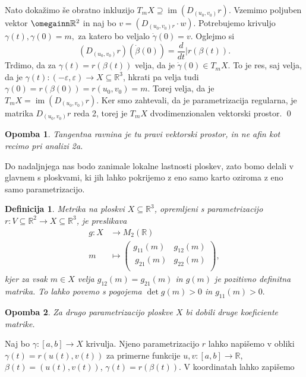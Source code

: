 \documentclass[10pt, a4paper]{article}
\newtheorem{defi}[izr]{Definicija}
\newenvironment{noticeB}{%
  \tcolorbox[%
  notitle,
  empty,
  enhanced,  %
  breakable,
  coltext=black,
  colback=white, 
  fontupper=\rmfamily,
  noparskip,
  sharp corners,
  boxrule=-1pt,  %
  frame hidden,
  left=7pt,  %
  right=7pt,
  top=5pt,
  bottom=5pt,
  before skip=2.5ex plus 2pt,
  after skip=2.5ex plus 2pt,
  borderline west = {1.5pt}{-0.1pt}{blue!30!black}, %
  overlay unbroken and last={%
    \draw[color=black, line width=1.25pt]
    ($(frame.south west)+(1.pt, -0.1pt)$) -- ++(2em, 0);
  }
  ]}
{\endtcolorbox}
\newenvironment{definicija}{\begin{noticeB}\begin{defi}}{%
\end{defi}\end{noticeB}}
\newtheorem*{opomba}{Opomba}
\begin{document}
Nato dokažimo še obratno inkluzijo $T_mX \supseteq
\operatorname{im} \left( D_{(u_0, v_0)}r \right)$. Vzemimo poljuben
vektor $\omegainn \mathbb{R}^2$ in naj bo $v = \left( D_{(u_0,
v_0)r} \cdot w \right)$. Potrebujemo krivuljo $\gamma(t),
\gamma(0) = m,$ za katero bo veljalo $\dot{\gamma} (0) = v.$
Oglejmo si \[ \left( D_{(u_0, v_0)}r \right)(\dot{\beta} (0)) =
\frac{d}{dt} \big| r(\beta(t)). \]  Trdimo, da za $\gamma(t) =
r(\beta(t))$  velja, da je $\dot{\gamma}(0) \in  T_mX.$ To
je res, saj velja, da je $\gamma(t): (-\varepsilon,
\varepsilon)\to  X \subseteq \mathbb{R}^3$, hkrati pa velja
tudi $\gamma(0) = r(\beta(0) )= r(u_0, v_0) = m$. Torej velja,
da je $T_mX = \operatorname{im}(D_{(u_0,v_0)}r)$. Ker smo zahtevali,
da je parametrizacija regularna, je matrika $D_{(u_0,v_0)}r$ reda 2,
torej je  $T_mX$ dvodimenzionalen vektorski prostor.   \qed

\begin{opomba}
 Tangentna ravnina je tu pravi vektorski prostor, in ne afin kot
 recimo pri analizi 2a.
\end{opomba}

Do nadaljnjega nas bodo zanimale lokalne lastnosti ploskev, zato bomo
delali v glavnem s ploskvami, ki jih lahko pokrijemo z eno samo karto
oziroma z eno samo parametrizacijo.

\begin{definicija}
\label{def_metrika_na_ploskvi}
 Metrika na ploskvi $X \subseteq  \mathbb{R}^3$, opremljeni s
 parametrizacijo $r: V \subseteq  \mathbb{R}^2 \to  X \subseteq
 \mathbb{R}^3$, je preslikava \begin{align*}
 	g: X &\longrightarrow M_2(\mathbb{R}) \\
 	m &\longmapsto 
	\begin{pmatrix}
		g_{11}(m) & g_{12}(m) \\\
		g_{21}(m) & g_{22}(m) \\
	\end{pmatrix},
 \end{align*}
 kjer za vsak $m \in  X$ velja $g_{12}(m) = g_{21}(m)$ in
 $g(m)$ je pozitivno definitna matrika. To lahko povemo s pogojema
 $\det g(m) > 0$ in $g_{11}(m) >0.$

\end{definicija}
\begin{opomba}
 Za drugo parametrizacijo ploskve $X$ bi dobili druge koeficiente
 matrike.
\end{opomba}
Naj bo $\gamma: [a,b] \to  X$ krivulja. Njeno parametrizacijo $r$
lahko napišemo v obliki  $\gamma(t) = r(u(t), v(t))$ za primerne
funkcije $u,v : [a,b] \to \mathbb{R}$, $\beta(t) = (u(t), v(t))$,
$\gamma(t) = r(\beta(t)).$ V koordinatah lahko zapišemo 
\end{document}
